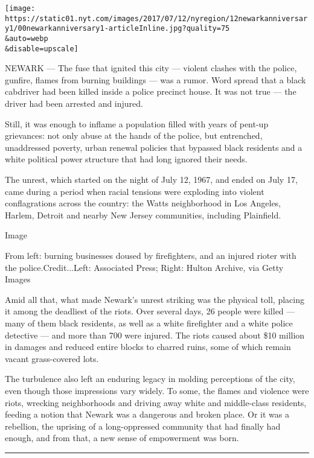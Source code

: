 \texttt{[image: https://static01.nyt.com/images/2017/07/12/nyregion/12newarkanniversary1/00newarkanniversary1-articleInline.jpg?quality=75\\\&auto=webp\\\&disable=upscale]}

NEWARK --- The fuse that ignited this city --- violent clashes with the
police, gunfire, flames from burning buildings --- was a rumor. Word
spread that a black cabdriver had been killed inside a police precinct
house. It was not true --- the driver had been arrested and injured.

Still, it was enough to inflame a population filled with years of
pent-up grievances: not only abuse at the hands of the police, but
entrenched, unaddressed poverty, urban renewal policies that bypassed
black residents and a white political power structure that had long
ignored their needs.

The unrest, which started on the night of July 12, 1967, and ended on
July 17, came during a period when racial tensions were exploding into
violent conflagrations across the country: the Watts neighborhood in Los
Angeles, Harlem, Detroit and nearby New Jersey communities, including
Plainfield.

Image

From left: burning businesses doused by firefighters, and an injured
rioter with the police.Credit...Left: Associated Press; Right: Hulton
Archive, via Getty Images

Amid all that, what made Newark's unrest striking was the physical toll,
placing it among the deadliest of the riots. Over several days, 26
people were killed --- many of them black residents, as well as a white
firefighter and a white police detective --- and more than 700 were
injured. The riots caused about \$10 million in damages and reduced
entire blocks to charred ruins, some of which remain vacant
grass-covered lots.

The turbulence also left an enduring legacy in molding perceptions of
the city, even though those impressions vary widely. To some, the flames
and violence were riots, wrecking neighborhoods and driving away white
and middle-class residents, feeding a notion that Newark was a dangerous
and broken place. Or it was a rebellion, the uprising of a
long-oppressed community that had finally had enough, and from that, a
new sense of empowerment was born.

\begin{center}\rule{0.5\linewidth}{\linethickness}\end{center}

